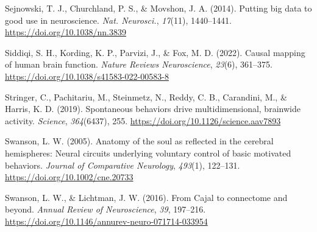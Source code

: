 \documentclass[
  letterpaper,
  DIV=11,
  numbers=noendperiod]{scrartcl}
\newlength{\cslhangindent}
\newenvironment{CSLReferences}[2] %
 {\begin{list}{}{%
  \setlength{\itemindent}{0pt}
  \setlength{\leftmargin}{0pt}
  \setlength{\parsep}{0pt}
  \ifodd #1
   \setlength{\leftmargin}{\cslhangindent}
   \setlength{\itemindent}{-1\cslhangindent}
  \fi
  \setlength{\itemsep}{#2\baselineskip}}}
 {\end{list}}
\begin{document}
\begin{CSLReferences}{1}{0}
Sejnowski, T. J., Churchland, P. S., \& Movshon, J. A. (2014). Putting
big data to good use in neuroscience. \emph{Nat. Neurosci.},
\emph{17}(11), 1440--1441. \url{https://doi.org/10.1038/nn.3839}

Siddiqi, S. H., Kording, K. P., Parvizi, J., \& Fox, M. D. (2022).
Causal mapping of human brain function. \emph{Nature {R}eviews
{N}euroscience}, \emph{23}(6), 361--375.
\url{https://doi.org/10.1038/s41583-022-00583-8}

Stringer, C., Pachitariu, M., Steinmetz, N., Reddy, C. B., Carandini,
M., \& Harris, K. D. (2019). Spontaneous behaviors drive
multidimensional, brainwide activity. \emph{Science}, \emph{364}(6437),
255. \url{https://doi.org/10.1126/science.aav7893}

Swanson, L. W. (2005). Anatomy of the soul as reflected in the cerebral
hemispheres: Neural circuits underlying voluntary control of basic
motivated behaviors. \emph{Journal of Comparative Neurology},
\emph{493}(1), 122--131. \url{https://doi.org/10.1002/cne.20733}

Swanson, L. W., \& Lichtman, J. W. (2016). From {C}ajal to connectome
and beyond. \emph{Annual Review of Neuroscience}, \emph{39}, 197--216.
\url{https://doi.org/10.1146/annurev-neuro-071714-033954}

\end{CSLReferences}
\end{document}
